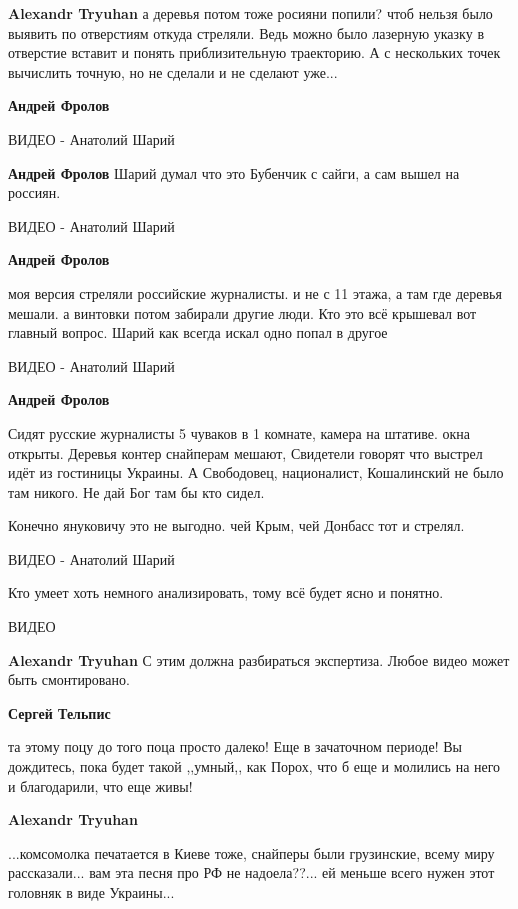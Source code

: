\begin{itemize}
\begin{itemize}
\textbf{Alexandr Tryuhan} а деревья потом тоже росияни попили? чтоб нельзя было выявить по отверстиям откуда стреляли. Ведь можно было лазерную указку в отверстие вставит и понять приблизительную траекторию. А с нескольких точек вычислить точную, но не сделали и не сделают уже...

\textbf{Андрей Фролов}

ВИДЕО - Анатолий Шарий

\textbf{Андрей Фролов} Шарий думал что это Бубенчик с сайги, а сам вышел на россиян.

ВИДЕО - Анатолий Шарий

\textbf{Андрей Фролов} 

моя версия стреляли российские журналисты. и не с 11 этажа, а там где деревья
мешали. а винтовки потом забирали другие люди. Кто это всё крышевал вот главный
вопрос. Шарий как всегда искал одно попал в другое

ВИДЕО - Анатолий Шарий

\textbf{Андрей Фролов} 

Сидят русские журналисты 5 чуваков в 1 комнате, камера на штативе. окна
открыты. Деревья контер снайперам мешают, Свидетели говорят что выстрел идёт из
гостиницы Украины. А Свободовец, националист, Кошалинский не было там никого.
Не дай Бог там бы кто сидел.

Конечно януковичу это не выгодно. чей Крым, чей Донбасс тот и стрелял.

ВИДЕО - Анатолий Шарий

Кто умеет хоть немного анализировать, тому всё будет ясно и понятно.

ВИДЕО

\textbf{Alexandr Tryuhan}
С этим должна разбираться экспертиза. Любое видео может быть смонтировано.

\textbf{Сергей Тельпис} 

та этому поцу до того поца просто далеко! Еще в зачаточном периоде! Вы
дождитесь, пока будет такой ,,умный,, как Порох, что б еще и молились на него и
благодарили, что еще живы!


\textbf{Alexandr Tryuhan} 

...комсомолка печатается в Киеве тоже, снайперы были грузинские, всему миру
рассказали... вам эта песня про РФ не надоела??... ей меньше всего нужен этот
головняк в виде Украины...


\end{itemize}
\end{itemize}
